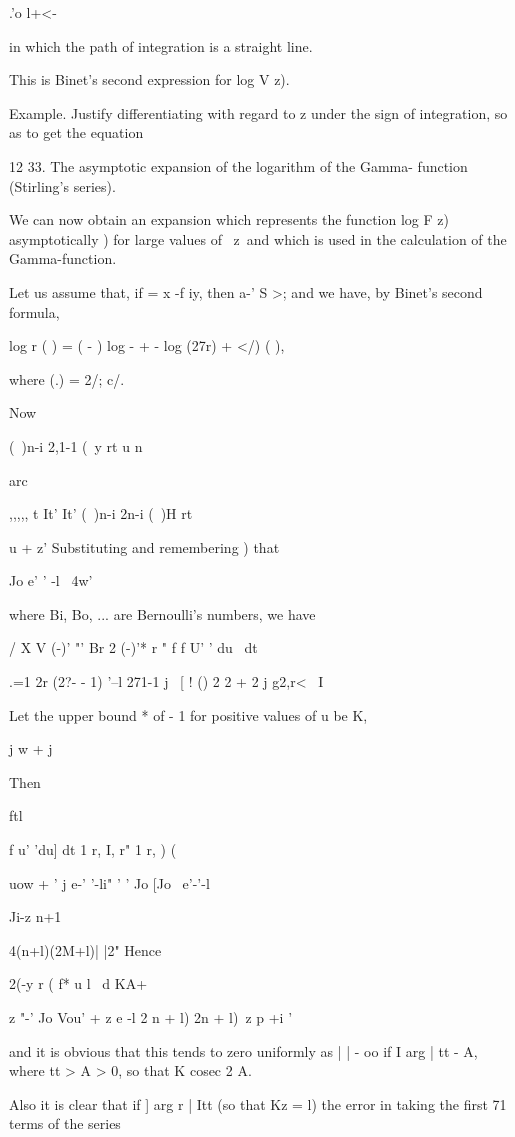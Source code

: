 .'o l+<-

in which the path of integration is a straight line.

This is Binet's second expression for log V z). 

Example. Justify differentiating with regard to z under the sign of
integration, so as to get the equation

12 33. The asymptotic expansion of the logarithm of the Gamma-
function (Stirling's series).

We can now obtain an expansion which represents the function log F z)
asymptotically ) for large values of \ z\, and which is used in
the calculation of the Gamma-function.

Let us assume that, if = x -f iy, then a-' S >; and we have, by
Binet's second formula,

log r ( ) = ( - ) log - + - log (27r) + </) ( ),

where (.) = 2/; c/.

Now

(\ )n-i 2,1-1 (\ y rt u n

arc

,,,,, t It' It' (\ )n-i 2n-i (\ )H rt

u + z' Substituting and remembering ) that

Jo e' ' -l ~4w'

%
%

where Bi, Bo, ... are Bernoulli's numbers, we have

  / X V (-)' "' Br 2 (-)'* r " f f U' ' du \ dt

.=1 2r (2?- - 1) '--l 271-1 j \ [ ! () 2 2 + 2 j g2,r< \ I

Let the upper bound * of - 1 for positive values of u be K,

j w + j

Then

ftl

f u' 'du] dt 1 r, I, r" 1 r, ) (

uow + ' j e-' '-li" ' ' Jo [Jo \ e'-'-l

Ji-z n+1

 4(n+l)(2M+l)| |2" Hence

2(-y r ( f* u l \ d KA+

z "-' Jo Vou' + z e -l 2 n + l) 2n + l)\ z p +i '

and it is obvious that this tends to zero uniformly as | | - oo if I
arg | tt - A, where tt > A > 0, so that K cosec 2 A.

Also it is clear that if ] arg r | Itt (so that Kz = l) the error in
taking the first 71 terms of the series

